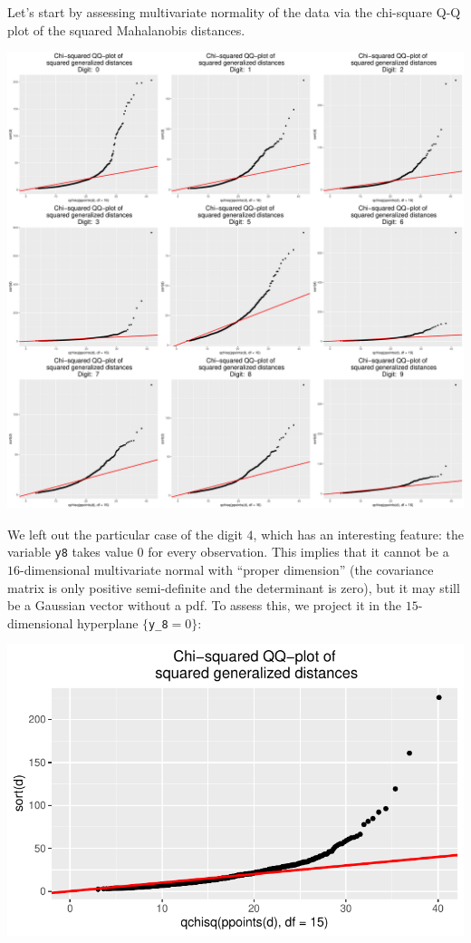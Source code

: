 \documentclass[
  letterpaper,
  DIV=11,
  numbers=noendperiod]{scrartcl}
\begin{document}
Let's start by assessing multivariate normality of the data via the
chi-square Q-Q plot of the squared Mahalanobis distances.

\includegraphics{ProblemSet2_files/figure-pdf/unnamed-chunk-62-1.pdf}

We left out the particular case of the digit \(4\), which has an
interesting feature: the variable \texttt{y8} takes value \(0\) for
every observation. This implies that it cannot be a \(16\)-dimensional
multivariate normal with ``proper dimension'' (the covariance matrix is
only positive semi-definite and the determinant is zero), but it may
still be a Gaussian vector without a pdf. To assess this, we project it
in the \(15\)-dimensional hyperplane \(\{\)\texttt{y\_8}\(=0\}\):

\includegraphics{ProblemSet2_files/figure-pdf/unnamed-chunk-63-1.pdf}
\end{document}
